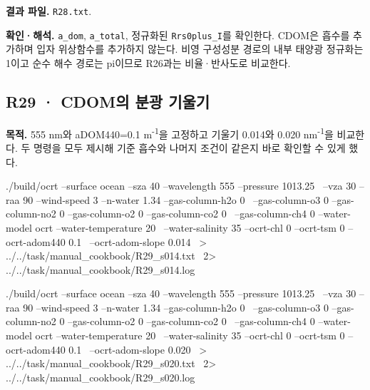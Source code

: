 \textbf{결과 파일. }\texttt{R28.txt}.

\textbf{확인·해석. }\texttt{a\_\allowbreak{}dom}, \texttt{a\_\allowbreak{}total}, 정규화된 \texttt{Rrs0plus\_\allowbreak{}I}를 확인한다. CDOM은 흡수를 추가하며 입자 위상함수를 추가하지 않는다. 비영 구성성분 경로의 내부 태양광 정규화는 1이고 순수 해수 경로는 pi이므로 R26과는 비율·반사도로 비교한다.


\subsection{R29 · CDOM의 분광 기울기}
\label{sec:auto:09_cookbook:6.4}

\label{recipe:R29}

\textbf{목적. }555 nm와 aDOM440=0.1 m\textsuperscript{-1}을 고정하고 기울기 0.014와 0.020 nm\textsuperscript{-1}을 비교한다. 두 명령을 모두 제시해 기준 흡수와 나머지 조건이 같은지 바로 확인할 수 있게 했다.

\noindent\begin{minipage}{\linewidth}
\begin{ManualCode}

./build/ocrt --surface ocean --sza 40 --wavelength 555 --pressure 1013.25 \
  --vza 30 --raa 90 --wind-speed 3 --n-water 1.34 --gas-column-h2o 0 \
  --gas-column-o3 0 --gas-column-no2 0 --gas-column-o2 0 --gas-column-co2 0 \
  --gas-column-ch4 0 --water-model ocrt --water-temperature 20 \
  --water-salinity 35 --ocrt-chl 0 --ocrt-tsm 0 --ocrt-adom440 0.1 \
  --ocrt-adom-slope 0.014 \
  > ../../task/manual_cookbook/R29_s014.txt \
  2> ../../task/manual_cookbook/R29_s014.log

\end{ManualCode}
\end{minipage}\par

\noindent\begin{minipage}{\linewidth}
\begin{ManualCode}

./build/ocrt --surface ocean --sza 40 --wavelength 555 --pressure 1013.25 \
  --vza 30 --raa 90 --wind-speed 3 --n-water 1.34 --gas-column-h2o 0 \
  --gas-column-o3 0 --gas-column-no2 0 --gas-column-o2 0 --gas-column-co2 0 \
  --gas-column-ch4 0 --water-model ocrt --water-temperature 20 \
  --water-salinity 35 --ocrt-chl 0 --ocrt-tsm 0 --ocrt-adom440 0.1 \
  --ocrt-adom-slope 0.020 \
  > ../../task/manual_cookbook/R29_s020.txt \
  2> ../../task/manual_cookbook/R29_s020.log

\end{ManualCode}
\end{minipage}\par

